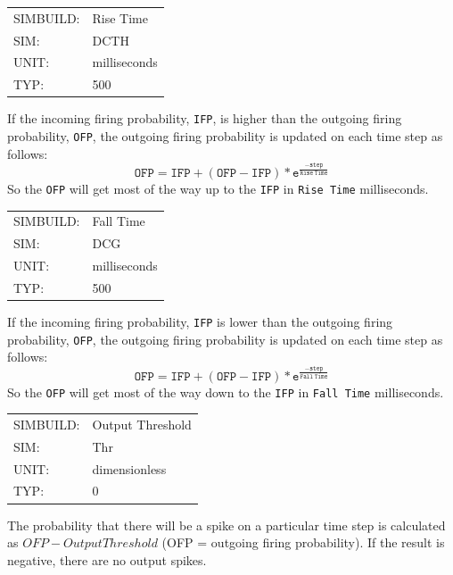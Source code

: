 \documentclass[12pt,openany,oneside]{book}
\newcommand{\ticode}[1]{\texttt{#1}}
\newcommand{\tmcode}[1]{\mathtt{#1}}
\begin{document}
\begin{flushleft}
\begin{tabular}{@{}ll@{}}
SIMBUILD: & Rise Time\\
SIM: & DCTH\\
UNIT: & milliseconds\\
TYP: & 500\\
\end{tabular}
\end{flushleft}
\noindent
If the incoming firing probability, \ticode{IFP}, is higher than the outgoing
firing probability, \ticode{OFP}, the outgoing firing probability is updated
on each time step as follows:
$$
\tmcode{OFP = IFP + (OFP - IFP) * e^{\tfrac{-step}{Rise\ Time}}}
$$
So the \ticode{OFP} will get most of the way up to the
\ticode{IFP} in \ticode{Rise Time} milliseconds.
\filbreak
\vspace{\baselineskip}

\begin{flushleft}
\begin{tabular}{@{}ll@{}}
SIMBUILD: & Fall Time\\
SIM: & DCG\\
UNIT: & milliseconds\\
TYP: & 500\\
\end{tabular}
\end{flushleft}
\noindent
If the incoming firing probability, \ticode{IFP} is lower than the outgoing
firing probability, \ticode{OFP}, the outgoing firing probability is updated
on each time step as follows: 
$$
\tmcode{OFP = IFP + (OFP - IFP) * e^{\tfrac{-step}{Fall\ Time}}}
$$
So the \ticode{OFP} will get most of the way down to the \ticode{IFP} in
\ticode{Fall Time} milliseconds.
\filbreak
\vspace{\baselineskip}

\begin{flushleft}
\begin{tabular}{@{}ll@{}}
SIMBUILD: & Output Threshold\\
SIM: & Thr\\
UNIT: & dimensionless\\
TYP: & 0\\
\end{tabular}
\end{flushleft}
\noindent
The probability that there will be a spike on a particular time step
is calculated as $OFP - OutputThreshold$ (OFP = outgoing firing probability).
If the result is negative, there are no output spikes.
\filbreak
\vspace{\baselineskip}
\end{document}
